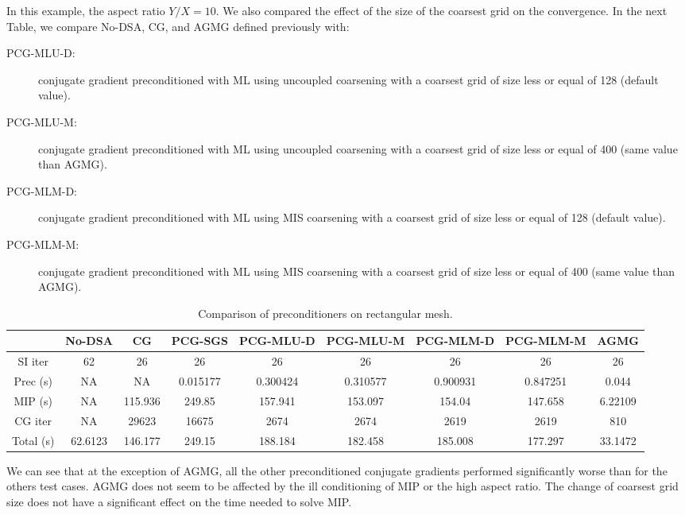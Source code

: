 In this example, the aspect ratio $Y/X = 10$. We
also compared the effect of the size of the coarsest grid on the convergence.
In the next Table, we compare No-DSA, CG, and AGMG defined previously with:
\begin{description}
  \item[PCG-MLU-D:] conjugate gradient preconditioned with ML
    using uncoupled coarsening with a coarsest grid of size less 
    or equal of 128 (default value).
  \item[PCG-MLU-M:] conjugate gradient preconditioned with ML
    using uncoupled coarsening with a coarsest grid of size less 
    or equal of 400 (same value than AGMG).
  \item[PCG-MLM-D:] conjugate gradient preconditioned with ML
    using MIS coarsening with a coarsest grid of size less or 
    equal of 128 (default value).
  \item[PCG-MLM-M:] conjugate gradient preconditioned with ML
    using MIS coarsening with a coarsest grid of size less or 
    equal of 400 (same value than AGMG).
\end{description}
\begin{landscape}
  \begin{center}
    \begin{table}[H]
      \caption{Comparison of preconditioners on rectangular mesh.}
      \begin{centering}
        \begin{tabular}{|c|c|c|c|c|c|c|c|c|}
          \hline
          & No-DSA & CG & PCG-SGS & PCG-MLU-D & PCG-MLU-M & PCG-MLM-D &
          PCG-MLM-M & AGMG \\
          \hline
          SI iter    & 62      & 26      & 26       & 26       & 26       & 
            26       & 26       &  26 \\
          Prec (s)   & NA      & NA      & 0.015177 & 0.300424 & 0.310577 &
            0.900931 & 0.847251 & 0.044 \\
          MIP (s)    & NA      & 115.936 & 249.85   & 157.941  & 153.097  & 
            154.04   & 147.658  & 6.22109\\
          CG iter    & NA      & 29623   & 16675    & 2674     & 2674     & 
            2619     & 2619     & 810 \\
          Total (s)  & 62.6123 & 146.177 & 249.15   & 188.184  & 182.458  & 
            185.008  & 177.297  & 33.1472\\
          \hline
        \end{tabular}
      \end{centering}
    \end{table}
  \end{center}
\end{landscape}
We can see that at the exception of AGMG, all the other preconditioned 
conjugate gradients performed significantly worse than for the others test 
cases. AGMG does not seem to be affected by the ill conditioning of MIP or the 
high aspect ratio. The change of coarsest grid size does not have a significant 
effect on the time needed to solve MIP.
